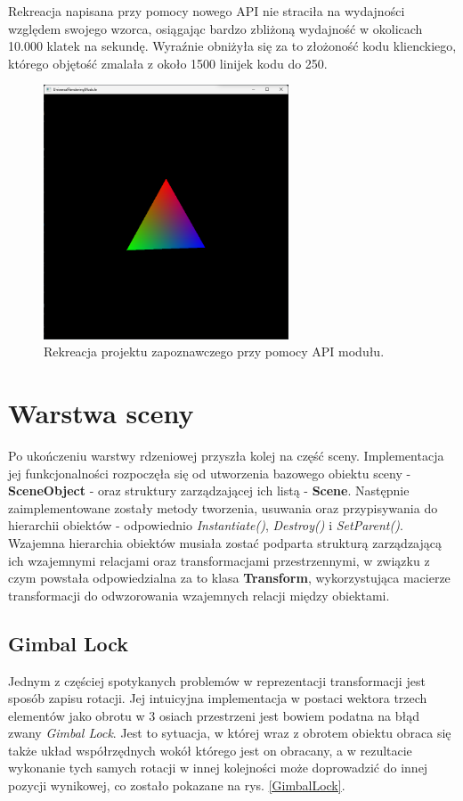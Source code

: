 Rekreacja napisana przy pomocy nowego API nie straciła na wydajności względem swojego wzorca, osiągając bardzo zbliżoną wydajność w okolicach 10.000 klatek na sekundę. Wyraźnie obniżyła się za to złożoność kodu klienckiego, którego objętość zmalała z około 1500 linijek kodu do 250. 

\begin{figure}[h!]
	\centering
	\includegraphics[width=275px]{images/impl/2_rotating_triangle.png}
	\caption{Rekreacja projektu zapoznawczego przy pomocy API modułu.}
	\label{Impl_RotatingTriangle}
\end{figure}

\section{Warstwa sceny}
Po ukończeniu warstwy rdzeniowej przyszła kolej na część sceny. Implementacja jej funkcjonalności rozpoczęła się od utworzenia bazowego obiektu sceny - \textbf{SceneObject} - oraz struktury zarządzającej ich listą - \textbf{Scene}. Następnie zaimplementowane zostały metody tworzenia, usuwania oraz przypisywania do hierarchii obiektów - odpowiednio \textit{Instantiate()}, \textit{Destroy()} i \textit{SetParent()}. Wzajemna hierarchia obiektów musiała zostać podparta strukturą zarządzającą ich wzajemnymi relacjami oraz transformacjami przestrzennymi, w związku z czym powstała odpowiedzialna za to klasa \textbf{Transform}, wykorzystująca macierze transformacji do odwzorowania wzajemnych relacji między obiektami.

\subsection{Gimbal Lock}
Jednym z częściej spotykanych problemów w reprezentacji transformacji jest sposób zapisu rotacji. Jej intuicyjna implementacja w postaci wektora trzech elementów jako obrotu w 3 osiach przestrzeni jest bowiem podatna na błąd zwany \textit{Gimbal Lock}. Jest to sytuacja, w której wraz z obrotem obiektu obraca się także układ współrzędnych wokół którego jest on obracany, a w rezultacie wykonanie tych samych rotacji w innej kolejności może doprowadzić do innej pozycji wynikowej, co zostało pokazane na rys. \ref{GimbalLock}.

